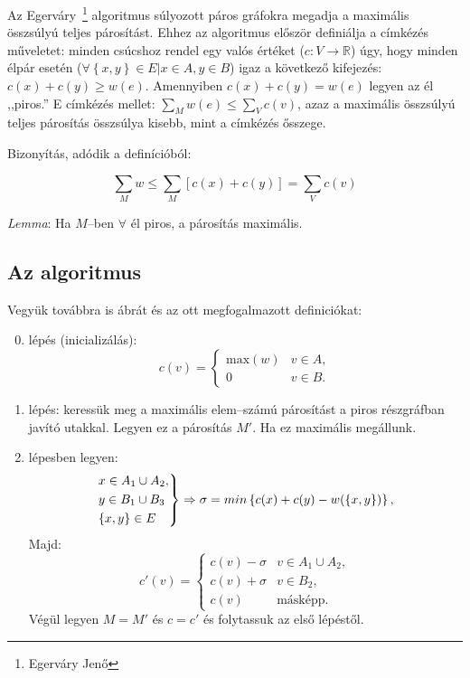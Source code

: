 Az Egerváry~\footnote{Egerváry Jenő} algoritmus súlyozott páros gráfokra megadja
a maximális összsúlyú teljes párosítást. Ehhez az algoritmus először definiálja
a címkézés műveletet: minden csúcshoz rendel egy valós értéket ($c:V \rightarrow
\mathbb{R}$) úgy, hogy minden élpár esetén ($\forall \left\{x,y\right\} \in E |
x \in A, y \in B$) igaz a következő kifejezés: $c(x)+c(y) \geq w(e)$. Amennyiben
$c(x)+c(y)=w(e)$ legyen az él ,,piros.'' E címkézés mellet: $\sum_Mw(e) \leq
\sum_Vc(v)$, azaz a maximális összsúlyú teljes párosítás összsúlya kisebb, mint
a címkézés ősszege.

Bizonyítás, adódik a definícióból:

\begin{displaymath}
\sum_M{w} \leq \sum_M{\left[c(x)+c(y)\right]} = \sum_V{c(v)}
\end{displaymath}

\emph{Lemma}: Ha $M$--ben $\forall$ él piros, a párosítás maximális.

\subsection{Az algoritmus}

Vegyük továbbra is  ábrát és az ott megfogalmazott definiciókat:

\begin{enumerate}
  \setcounter{enumi}{-1}
  \item lépés (inicializálás):   \begin{displaymath}
  c(v)=\begin{cases}
  \mbox{max}(w) & v \in A, \\
  0             & v \in B.
  \end{cases} 
  \end{displaymath}
  \item lépés: keressük meg a maximális elem--számú párosítást a piros részgráfban
  javító utakkal.
  Legyen ez a párosítás $M'$. Ha ez maximális megállunk.
  \item lépesben legyen:
  \begin{displaymath}
  \begin{rcases}
  x \in A_1 \cup A_2, \\
  y \in B_1 \cup B_3\\
  \{x,y\} \in E
  \end{rcases}
  \Rightarrow \sigma= min\left\{c(x) + c(y) - w(\left\{x,y\right\}) \right\},
  \end{displaymath}
  Majd: \begin{displaymath}
  c'(v)=\begin{cases}
  c(v)-\sigma & v \in A_1 \cup A_2, \\
  c(v)+\sigma & v \in B_2, \\
  c(v) 		   &  \mbox{másképp.}
  \end{cases} 
  \end{displaymath}
  Végül legyen $M=M'$ és $c=c'$ és folytassuk az első lépéstől.
\end{enumerate} 

